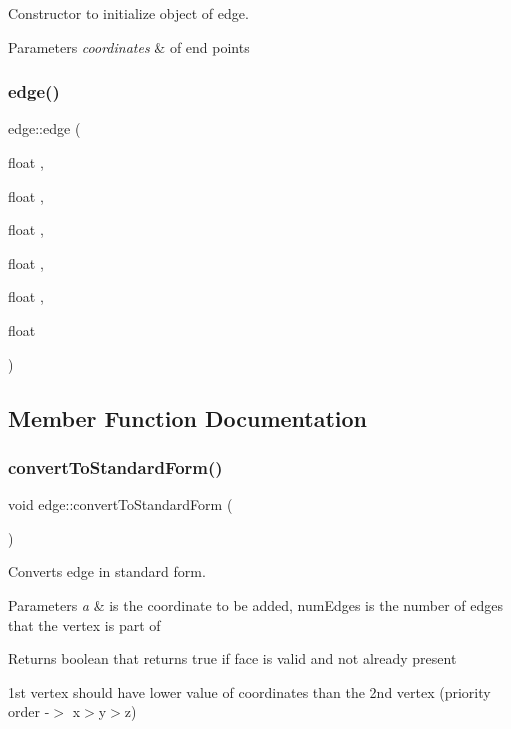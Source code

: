 Constructor to initialize object of edge. 


\begin{DoxyParams}{Parameters}
{\em coordinates} & of end points \\
\hline
\end{DoxyParams}
\mbox{\label{structedge_a1d17984abbf61a4d2d7b88c1113cb67e}} 
\subsubsection{\texorpdfstring{edge()}{edge()}\hspace{0.1cm}{\footnotesize\ttfamily [2/2]}}
{\footnotesize\ttfamily edge\+::edge (\begin{DoxyParamCaption}\item[{float}]{,  }\item[{float}]{,  }\item[{float}]{,  }\item[{float}]{,  }\item[{float}]{,  }\item[{float}]{ }\end{DoxyParamCaption})}



\subsection{Member Function Documentation}
\mbox{\label{structedge_adba29fb1e5fdb9f55cfcb3b0f57b407e}} 
\subsubsection{\texorpdfstring{convert\+To\+Standard\+Form()}{convertToStandardForm()}}
{\footnotesize\ttfamily void edge\+::convert\+To\+Standard\+Form (\begin{DoxyParamCaption}{ }\end{DoxyParamCaption})}



Converts edge in standard form. 


\begin{DoxyParams}{Parameters}
{\em a} & is the coordinate to be added, num\+Edges is the number of edges that the vertex is part of \\
\hline
\end{DoxyParams}
\begin{DoxyReturn}{Returns}
boolean that returns true if face is valid and not already present
\end{DoxyReturn}
1st vertex should have lower value of coordinates than the 2nd vertex (priority order -\/$>$ x$>$y$>$z) 

